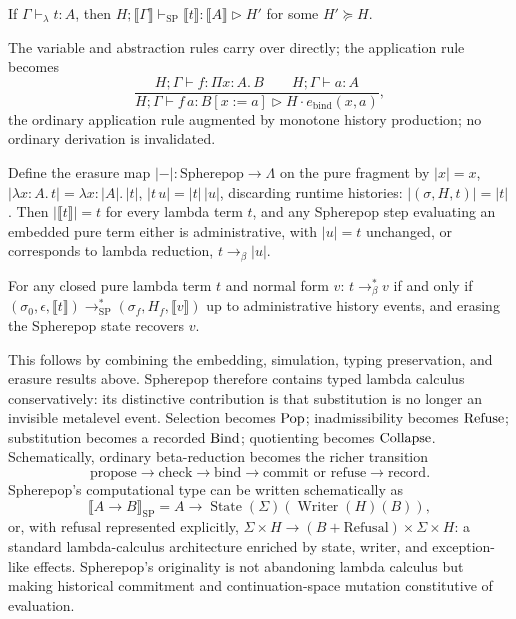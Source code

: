 \begin{theorem}
If $\Gamma \vdash_\lambda t : A$, then $H; \llbracket \Gamma \rrbracket \vdash_{\mathrm{SP}} \llbracket t \rrbracket : \llbracket A \rrbracket \triangleright H'$ for some $H' \succeq H$.
\end{theorem}

The variable and abstraction rules carry over directly; the application rule becomes
\[
\frac{H;\Gamma \vdash f : \Pi x{:}A.\,B \qquad H;\Gamma \vdash a : A}{H;\Gamma \vdash f\,a : B[x:=a] \triangleright H \cdot e_{\mathrm{bind}}(x,a)},
\]
the ordinary application rule augmented by monotone history production; no ordinary derivation is invalidated.

Define the erasure map $|-| : \mathrm{Spherepop} \to \Lambda$ on the pure fragment by $|x| = x$, $|\lambda x{:}A.\,t| = \lambda x{:}|A|.\,|t|$, $|t\,u| = |t|\,|u|$, discarding runtime histories: $|(\sigma, H, t)| = |t|$. Then $|\llbracket t \rrbracket| = t$ for every lambda term $t$, and any Spherepop step evaluating an embedded pure term either is administrative, with $|u| = t$ unchanged, or corresponds to lambda reduction, $t \longrightarrow_\beta |u|$.

\begin{theorem}[Conservativity]
For any closed pure lambda term $t$ and normal form $v$: $t \longrightarrow_\beta^\ast v$ if and only if $(\sigma_0, \epsilon, \llbracket t \rrbracket) \longrightarrow_{\mathrm{SP}}^\ast (\sigma_f, H_f, \llbracket v \rrbracket)$ up to administrative history events, and erasing the Spherepop state recovers $v$.
\end{theorem}

This follows by combining the embedding, simulation, typing preservation, and erasure results above. Spherepop therefore contains typed lambda calculus conservatively: its distinctive contribution is that substitution is no longer an invisible metalevel event. Selection becomes $\mathrm{Pop}$; inadmissibility becomes $\mathrm{Refuse}$; substitution becomes a recorded $\mathrm{Bind}$; quotienting becomes $\mathrm{Collapse}$. Schematically, ordinary beta-reduction becomes the richer transition
\[
\text{propose} \to \text{check} \to \text{bind} \to \text{commit or refuse} \to \text{record}.
\]
Spherepop's computational type can be written schematically as
\[
\llbracket A \to B \rrbracket_{\mathrm{SP}} = A \to \operatorname{State}(\Sigma)(\operatorname{Writer}(H)(B)),
\]
or, with refusal represented explicitly, $\Sigma \times H \to (B + \mathrm{Refusal}) \times \Sigma \times H$: a standard lambda-calculus architecture enriched by state, writer, and exception-like effects. Spherepop's originality is not abandoning lambda calculus but making historical commitment and continuation-space mutation constitutive of evaluation.


